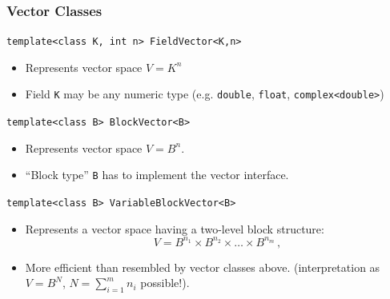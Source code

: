 \begin{frame} \frametitle{Vector Classes}
  \begin{block}{\lstinline!template<class K, int n> FieldVector<K,n>!}
    \begin{itemize}
    \item Represents vector space $V=K^n$
    \item Field \lstinline!K! may be any numeric type (e.g.  
      \lstinline!double!, \lstinline!float!,
      \lstinline!complex<double>!)
    \end{itemize}
  \end{block}
  \begin{block}{\lstinline!template<class B> BlockVector<B>!}
    \begin{itemize}
  \item Represents vector space $V=B^n$.
  \item ``Block type'' \lstinline!B! has to implement the vector
    interface.
\end{itemize}
  \end{block}
  \begin{block}{\lstinline!template<class B> VariableBlockVector<B>!}
    \begin{itemize}
    \item Represents a vector space having a two-level
      block structure:
      $$V=B^{n_1}\times B^{n_2}\times\ldots \times B^{n_m}\,,$$
    \item More efficient than resembled by vector classes above.
      (interpretation as $V=B^N$,  $N={\sum_{i=1}^{m} n_i}$ possible!).
    \end{itemize}
  \end{block}
\end{frame}
